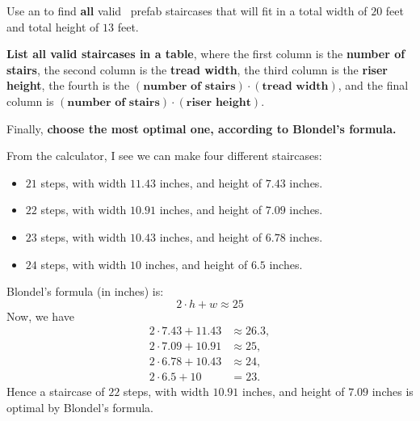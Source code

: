 \documentclass[noauthor,nooutcomes,handout,12pt]{ximera}
\begin{document}
\mynewpage

\begin{question}
  Use an  to
  find \textbf{all} valid \mooculus~prefab staircases that will fit in
  a total width of $20$ feet and total height of $13$ feet.

  \textbf{List all valid staircases in a table}, where the first
  column is the \textbf{number of stairs}, the second column is the
  \textbf{tread width}, the third column is the \textbf{riser height},
  the fourth is the $\boldsymbol{(\textbf{number of stairs}) \cdot (\textbf{tread width})}$, and the final column is $\boldsymbol{(\textbf{number of stairs}) \cdot (\textbf{riser height})}$.

 Finally, \textbf{choose the most optimal one, according to Blondel's
   formula.}

  \begin{freeResponse}
    From the calculator, I see we can make four different staircases:
    \begin{itemize}
    \item $21$ steps, with width $11.43$ inches, and height of $7.43$ inches.
    \item $22$ steps, with width $10.91$ inches, and height of $7.09$ inches.
    \item $23$ steps, with width $10.43$ inches, and height of $6.78$ inches.
    \item $24$ steps, with width $10$ inches, and height of $6.5$ inches.
    \end{itemize}
    Blondel's formula (in inches) is:
    \[
    2\cdot h + w \approx 25
    \]
    Now, we have
    \begin{align*}
      2\cdot 7.43 + 11.43 &\approx 26.3,\\
      2\cdot 7.09 + 10.91 &\approx 25,\\
      2\cdot 6.78 + 10.43 &\approx 24,\\
      2\cdot 6.5 + 10 &= 23.
    \end{align*}
    Hence a staircase of $22$ steps, with width $10.91$ inches, and
    height of $7.09$ inches is optimal by Blondel's formula.
  \end{freeResponse}
\end{question}
\mynewpage
\end{document}

